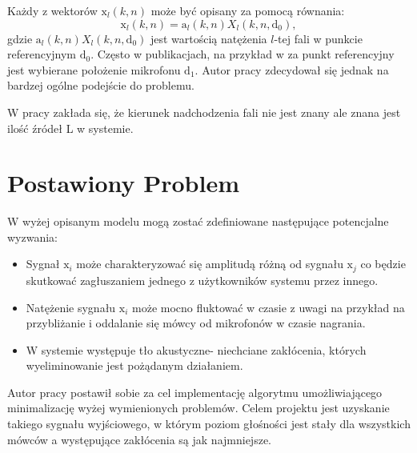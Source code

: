 \noindent Każdy z wektorów $\bm{\mathrm{x}}_l(k,n)$ może być opisany za pomocą równania:
\begin{equation}
    \label{equation:2.3}
    \bm{\mathrm{x}}_l(k,n)=
    \bm{\mathrm{a}}_l(k,n)X_{l}(k,n,\bm{\mathrm{d}}_{0}),
\end{equation}
\noindent gdzie $\bm{\mathrm{a}}_l(k,n)X_{l}(k,n,\bm{\mathrm{d}}_{0})$ jest wartością natężenia $l$-tej fali w punkcie referencyjnym $\bm{\mathrm{d}}_0$. Często w publikacjach, na przykład w \cite{Braun2014} za punkt referencyjny jest wybierane położenie mikrofonu $\bm{\mathrm{d}}_1$. Autor pracy zdecydował się jednak na bardzej ogólne podejście do problemu.

\noindent W pracy zakłada się, że kierunek nadchodzenia fali nie jest znany ale znana jest ilość źródeł L w systemie.


\newpage
\section{Postawiony Problem}

W wyżej opisanym modelu mogą zostać zdefiniowane następujące potencjalne wyzwania:
\begin{itemize}
    \item Sygnał $\bm{\mathrm{x}}_{i}$ może charakteryzować się amplitudą różną od sygnału $\bm{\mathrm{x}}_{j}$ co będzie skutkować zagłuszaniem jednego z użytkowników systemu przez innego. 
    \item Natężenie sygnału $\bm{\mathrm{x}}_{i}$ może mocno fluktować w czasie z uwagi na przykład na przybliżanie i oddalanie się mówcy od mikrofonów w czasie nagrania.
    \item W systemie występuje tło akustyczne- niechciane zakłócenia, których wyeliminowanie jest pożądanym działaniem.
\end{itemize}

\noindent Autor pracy postawił sobie za cel implementację algorytmu umożliwiającego minimalizację wyżej wymienionych problemów. Celem projektu jest uzyskanie takiego sygnału wyjściowego, w którym poziom głośności jest stały dla wszystkich mówców a występujące zakłócenia są jak najmniejsze.
